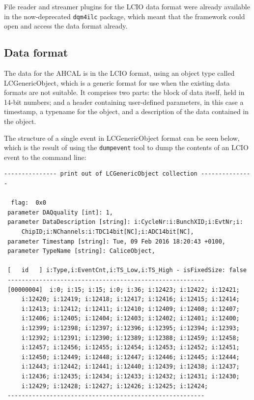 File reader and streamer plugins for the \acrshort{LCIO} data format were already available in the now-deprecated \texttt{dqm4ilc} package, which meant that the framework could open and access the data format already.

\subsection{Data format}
The data for the \acrshort{AHCAL} is in the \acrfull{LCIO} format, using an object type called LCGenericObject, which is a generic format for use when the existing data formats are not suitable. It comprises two parts: the block of data itself, held in 14-bit numbers; and a header containing user-defined parameters, in this case a timestamp, a typename for the object, and a description of the data contained in the object.

The structure of a single event in LCGenericObject format can be seen below, which is the result of using the \texttt{dumpevent} tool to dump the contents of an \acrshort{LCIO} event to the command line:

\begin{verbatim}
--------------- print out of LCGenericObject collection --------------- 

  flag:  0x0
 parameter DAQquality [int]: 1, 
 parameter DataDescription [string]: i:CycleNr:i:BunchXID;i:EvtNr;i:
     ChipID;i:NChannels:i:TDC14bit[NC];i:ADC14bit[NC],
 parameter Timestamp [string]: Tue, 09 Feb 2016 18:20:43 +0100,
 parameter TypeName [string]: CaliceObject,

 [   id   ] i:Type,i:EventCnt,i:TS_Low,i:TS_High - isFixedSize: false
 --------------------------------------------------------
 [00000004]  i:0; i:15; i:15; i:0; i:36; i:12423; i:12422; i:12421;
     i:12420; i:12419; i:12418; i:12417; i:12416; i:12415; i:12414;
     i:12413; i:12412; i:12411; i:12410; i:12409; i:12408; i:12407;
     i:12406; i:12405; i:12404; i:12403; i:12402; i:12401; i:12400;
     i:12399; i:12398; i:12397; i:12396; i:12395; i:12394; i:12393;
     i:12392; i:12391; i:12390; i:12389; i:12388; i:12459; i:12458;
     i:12457; i:12456; i:12455; i:12454; i:12453; i:12452; i:12451;
     i:12450; i:12449; i:12448; i:12447; i:12446; i:12445; i:12444;
     i:12443; i:12442; i:12441; i:12440; i:12439; i:12438; i:12437;
     i:12436; i:12435; i:12434; i:12433; i:12432; i:12431; i:12430;
     i:12429; i:12428; i:12427; i:12426; i:12425; i:12424;
 --------------------------------------------------------
\end{verbatim}

